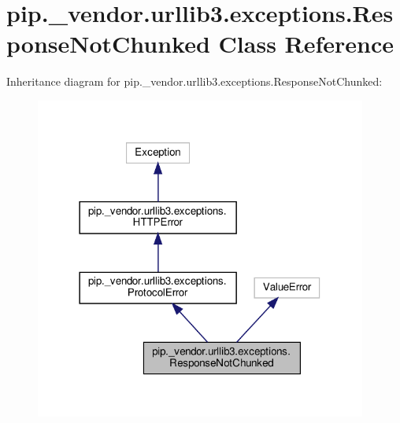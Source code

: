 \hypertarget{classpip_1_1__vendor_1_1urllib3_1_1exceptions_1_1ResponseNotChunked}{}\section{pip.\+\_\+vendor.\+urllib3.\+exceptions.\+Response\+Not\+Chunked Class Reference}
\label{classpip_1_1__vendor_1_1urllib3_1_1exceptions_1_1ResponseNotChunked}


Inheritance diagram for pip.\+\_\+vendor.\+urllib3.\+exceptions.\+Response\+Not\+Chunked\+:
\nopagebreak
\begin{figure}[H]
\begin{center}
\leavevmode
\includegraphics[width=309pt]{classpip_1_1__vendor_1_1urllib3_1_1exceptions_1_1ResponseNotChunked__inherit__graph}
\end{center}
\end{figure}


